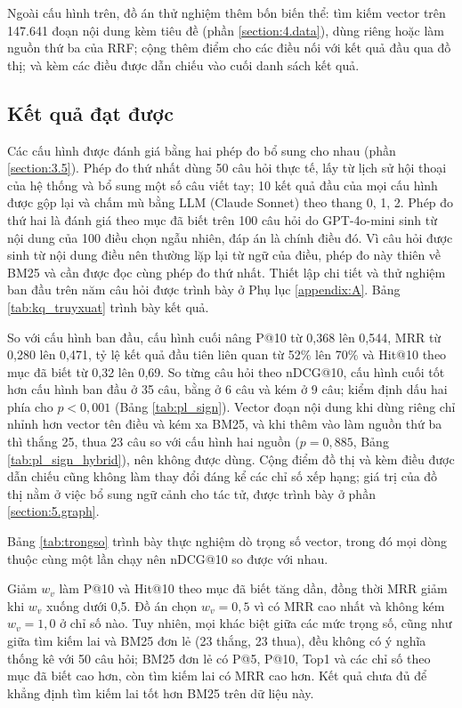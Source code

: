 \documentclass[../DoAn.tex]{subfiles}
\begin{document}
Ngoài cấu hình trên, đồ án thử nghiệm thêm bốn biến thể: tìm kiếm vector trên 147.641 đoạn nội dung kèm tiêu đề (phần \ref{section:4.data}), dùng riêng hoặc làm nguồn thứ ba của RRF; cộng thêm điểm cho các điều nối với kết quả đầu qua đồ thị; và kèm các điều được dẫn chiếu vào cuối danh sách kết quả.

\subsection{Kết quả đạt được}
Các cấu hình được đánh giá bằng hai phép đo bổ sung cho nhau (phần \ref{section:3.5}). Phép đo thứ nhất dùng 50 câu hỏi thực tế, lấy từ lịch sử hội thoại của hệ thống và bổ sung một số câu viết tay; 10 kết quả đầu của mọi cấu hình được gộp lại và chấm mù bằng LLM (Claude Sonnet) theo thang 0, 1, 2. Phép đo thứ hai là đánh giá theo mục đã biết trên 100 câu hỏi do GPT-4o-mini sinh từ nội dung của 100 điều chọn ngẫu nhiên, đáp án là chính điều đó. Vì câu hỏi được sinh từ nội dung điều nên thường lặp lại từ ngữ của điều, phép đo này thiên về BM25 và cần được đọc cùng phép đo thứ nhất. Thiết lập chi tiết và thử nghiệm ban đầu trên năm câu hỏi được trình bày ở Phụ lục \ref{appendix:A}. Bảng \ref{tab:kq_truyxuat} trình bày kết quả.



So với cấu hình ban đầu, cấu hình cuối nâng P@10 từ 0,368 lên 0,544, MRR từ 0,280 lên 0,471, tỷ lệ kết quả đầu tiên liên quan từ 52\% lên 70\% và Hit@10 theo mục đã biết từ 0,32 lên 0,69. So từng câu hỏi theo nDCG@10, cấu hình cuối tốt hơn cấu hình ban đầu ở 35 câu, bằng ở 6 câu và kém ở 9 câu; kiểm định dấu hai phía cho $p < 0{,}001$ (Bảng \ref{tab:pl_sign}). Vector đoạn nội dung khi dùng riêng chỉ nhỉnh hơn vector tên điều và kém xa BM25, và khi thêm vào làm nguồn thứ ba thì thắng 25, thua 23 câu so với cấu hình hai nguồn ($p = 0{,}885$, Bảng \ref{tab:pl_sign_hybrid}), nên không được dùng. Cộng điểm đồ thị và kèm điều được dẫn chiếu cũng không làm thay đổi đáng kể các chỉ số xếp hạng; giá trị của đồ thị nằm ở việc bổ sung ngữ cảnh cho tác tử, được trình bày ở phần \ref{section:5.graph}.

Bảng \ref{tab:trongso} trình bày thực nghiệm dò trọng số vector, trong đó mọi dòng thuộc cùng một lần chạy nên nDCG@10 so được với nhau.



Giảm $w_{v}$ làm P@10 và Hit@10 theo mục đã biết tăng dần, đồng thời MRR giảm khi $w_{v}$ xuống dưới 0,5. Đồ án chọn $w_{v} = 0{,}5$ vì có MRR cao nhất và không kém $w_{v} = 1{,}0$ ở chỉ số nào. Tuy nhiên, mọi khác biệt giữa các mức trọng số, cũng như giữa tìm kiếm lai và BM25 đơn lẻ (23 thắng, 23 thua), đều không có ý nghĩa thống kê với 50 câu hỏi; BM25 đơn lẻ có P@5, P@10, Top1 và các chỉ số theo mục đã biết cao hơn, còn tìm kiếm lai có MRR cao hơn. Kết quả chưa đủ để khẳng định tìm kiếm lai tốt hơn BM25 trên dữ liệu này.
\end{document}
